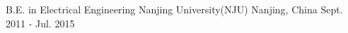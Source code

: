 

\begin{cventries}

  \cventry
    {B.E. in Electrical Engineering} %
    {Nanjing University(NJU)} %
    {Nanjing, China} %
    {Sept. 2011 - Jul. 2015} %
    {
      \begin{cvitems} %
      \end{cvitems}
    }

\end{cventries}
